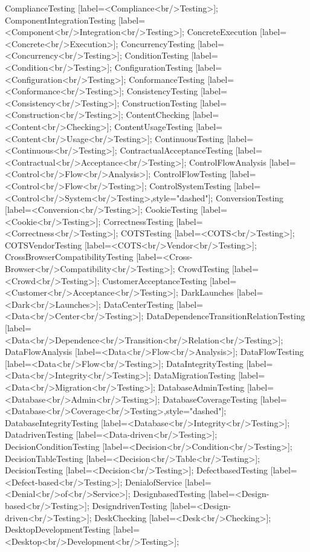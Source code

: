 \documentclass{article}
\begin{document}
{ComplianceTesting [label=<Compliance<br/>Testing>];
ComponentIntegrationTesting [label=<Component<br/>Integration<br/>Testing>];
ConcreteExecution [label=<Concrete<br/>Execution>];
ConcurrencyTesting [label=<Concurrency<br/>Testing>];
ConditionTesting [label=<Condition<br/>Testing>];
ConfigurationTesting [label=<Configuration<br/>Testing>];
ConformanceTesting [label=<Conformance<br/>Testing>];
ConsistencyTesting [label=<Consistency<br/>Testing>];
ConstructionTesting [label=<Construction<br/>Testing>];
ContentChecking [label=<Content<br/>Checking>];
ContentUsageTesting [label=<Content<br/>Usage<br/>Testing>];
ContinuousTesting [label=<Continuous<br/>Testing>];
ContractualAcceptanceTesting [label=<Contractual<br/>Acceptance<br/>Testing>];
ControlFlowAnalysis [label=<Control<br/>Flow<br/>Analysis>];
ControlFlowTesting [label=<Control<br/>Flow<br/>Testing>];
ControlSystemTesting [label=<Control<br/>System<br/>Testing>,style="dashed"];
ConversionTesting [label=<Conversion<br/>Testing>];
CookieTesting [label=<Cookie<br/>Testing>];
CorrectnessTesting [label=<Correctness<br/>Testing>];
COTSTesting [label=<COTS<br/>Testing>];
COTSVendorTesting [label=<COTS<br/>Vendor<br/>Testing>];
CrossBrowserCompatibilityTesting [label=<Cross-Browser<br/>Compatibility<br/>Testing>];
CrowdTesting [label=<Crowd<br/>Testing>];
CustomerAcceptanceTesting [label=<Customer<br/>Acceptance<br/>Testing>];
DarkLaunches [label=<Dark<br/>Launches>];
DataCenterTesting [label=<Data<br/>Center<br/>Testing>];
DataDependenceTransitionRelationTesting [label=<Data<br/>Dependence<br/>Transition<br/>Relation<br/>Testing>];
DataFlowAnalysis [label=<Data<br/>Flow<br/>Analysis>];
DataFlowTesting [label=<Data<br/>Flow<br/>Testing>];
DataIntegrityTesting [label=<Data<br/>Integrity<br/>Testing>];
DataMigrationTesting [label=<Data<br/>Migration<br/>Testing>];
DatabaseAdminTesting [label=<Database<br/>Admin<br/>Testing>];
DatabaseCoverageTesting [label=<Database<br/>Coverage<br/>Testing>,style="dashed"];
DatabaseIntegrityTesting [label=<Database<br/>Integrity<br/>Testing>];
DatadrivenTesting [label=<Data-driven<br/>Testing>];
DecisionConditionTesting [label=<Decision<br/>Condition<br/>Testing>];
DecisionTableTesting [label=<Decision<br/>Table<br/>Testing>];
DecisionTesting [label=<Decision<br/>Testing>];
DefectbasedTesting [label=<Defect-based<br/>Testing>];
DenialofService [label=<Denial<br/>of<br/>Service>];
DesignbasedTesting [label=<Design-based<br/>Testing>];
DesigndrivenTesting [label=<Design-driven<br/>Testing>];
DeskChecking [label=<Desk<br/>Checking>];
DesktopDevelopmentTesting [label=<Desktop<br/>Development<br/>Testing>];
}
\end{document}
